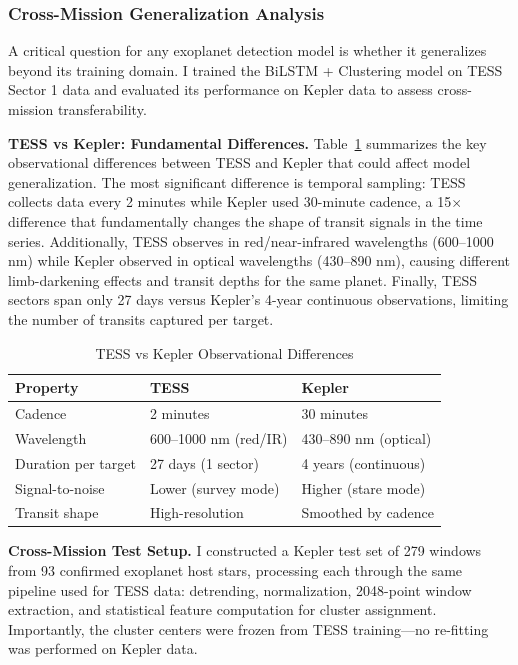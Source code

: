 
\subsubsection{Cross-Mission Generalization Analysis}

A critical question for any exoplanet detection model is whether it generalizes beyond its training domain. I trained the BiLSTM + Clustering model on TESS Sector 1 data and evaluated its performance on Kepler data to assess cross-mission transferability.

\textbf{TESS vs Kepler: Fundamental Differences.} Table~\ref{tab:mission_comparison} summarizes the key observational differences between TESS and Kepler that could affect model generalization. The most significant difference is temporal sampling: TESS collects data every 2 minutes while Kepler used 30-minute cadence, a 15$\times$ difference that fundamentally changes the shape of transit signals in the time series. Additionally, TESS observes in red/near-infrared wavelengths (600--1000 nm) while Kepler observed in optical wavelengths (430--890 nm), causing different limb-darkening effects and transit depths for the same planet. Finally, TESS sectors span only 27 days versus Kepler's 4-year continuous observations, limiting the number of transits captured per target.

\begin{table}[h]
\centering
\caption{TESS vs Kepler Observational Differences}
\label{tab:mission_comparison}
\begin{tabular}{@{}lll@{}}
\toprule
\textbf{Property} & \textbf{TESS} & \textbf{Kepler} \\
\midrule
Cadence & 2 minutes & 30 minutes \\
Wavelength & 600--1000 nm (red/IR) & 430--890 nm (optical) \\
Duration per target & 27 days (1 sector) & 4 years (continuous) \\
Signal-to-noise & Lower (survey mode) & Higher (stare mode) \\
Transit shape & High-resolution & Smoothed by cadence \\
\bottomrule
\end{tabular}
\end{table}

\textbf{Cross-Mission Test Setup.} I constructed a Kepler test set of 279 windows from 93 confirmed exoplanet host stars, processing each through the same pipeline used for TESS data: detrending, normalization, 2048-point window extraction, and statistical feature computation for cluster assignment. Importantly, the cluster centers were frozen from TESS training---no re-fitting was performed on Kepler data.

